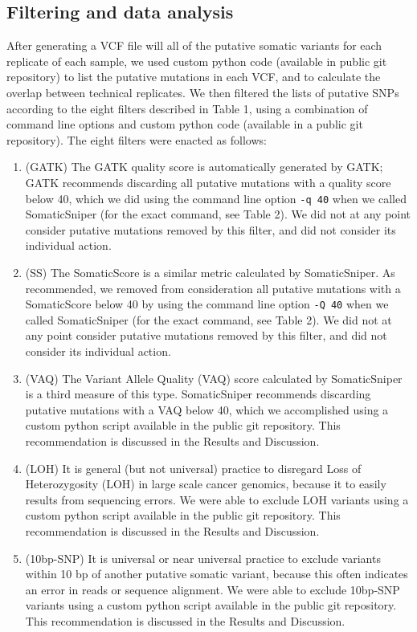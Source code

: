 \documentclass[11pt]{article} %
\begin{document}
\subsection{Filtering and data analysis}

After generating a VCF file will all of the putative somatic variants for each replicate of each sample, we used custom python code (available in public git repository) to list the putative mutations in each VCF, and to calculate the overlap between technical replicates. We then filtered the lists of putative SNPs according to the eight filters described in Table 1, using a combination of command line options and custom python code (available in a public git repository). The eight filters were enacted as follows: 

\begin{enumerate}
\item (GATK) The GATK quality score is automatically generated by GATK; GATK recommends discarding all putative mutations with a quality score below 40, which we did using the command line option \texttt{-q 40} when we called SomaticSniper (for the exact command, see Table 2). We did not at any point consider putative mutations removed by this filter, and did not consider its individual action. 
\item (SS) The SomaticScore is a similar metric calculated by SomaticSniper. As recommended, we removed from consideration all putative mutations with a SomaticScore below 40 by using the command line option \texttt{-Q 40} when we called SomaticSniper (for the exact command, see Table 2). We did not at any point consider putative mutations removed by this filter, and did not consider its individual action. 
\item (VAQ) The Variant Allele Quality (VAQ) score calculated by SomaticSniper is a third measure of this type. SomaticSniper recommends discarding putative mutations with a VAQ below 40, which we accomplished using a custom python script available in the public git repository. This recommendation is discussed in the Results and Discussion.
\item (LOH) It is general (but not universal) practice to disregard Loss of Heterozygosity (LOH) in large scale cancer genomics, because it to easily results from sequencing errors. We were able to exclude LOH variants using a custom python script available in the public git repository. This recommendation is discussed in the Results and Discussion.
\item (10bp-SNP) It is universal or near universal practice to exclude variants within 10 bp of another putative somatic variant, because this often indicates an error in reads or sequence alignment. We were able to exclude 10bp-SNP variants using a custom python script available in the public git repository. This recommendation is discussed in the Results and Discussion.

\end{enumerate}
\end{document}
